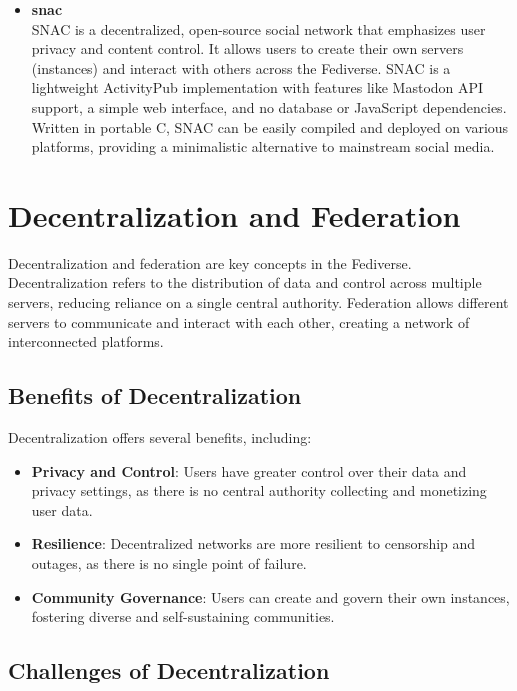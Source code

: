 \begin{itemize}
  \item \textbf{snac}\cite{snac}\\
    SNAC is a decentralized, open-source social network that emphasizes user privacy and content control. It allows users to create their own servers (instances) and interact with others across the Fediverse. SNAC is a lightweight ActivityPub implementation with features like Mastodon API support, a simple web interface, and no database or JavaScript dependencies. Written in portable C, SNAC can be easily compiled and deployed on various platforms, providing a minimalistic alternative to mainstream social media.

\end{itemize}

\section{Decentralization and Federation}

Decentralization and federation are key concepts in the Fediverse. Decentralization refers to the distribution of data and control across multiple servers, reducing reliance on a single central authority. Federation allows different servers to communicate and interact with each other, creating a network of interconnected platforms.

\subsection{Benefits of Decentralization}

Decentralization offers several benefits, including:

\begin{itemize}
  \item \textbf{Privacy and Control}: Users have greater control over their data and privacy settings, as there is no central authority collecting and monetizing user data.
  \item \textbf{Resilience}: Decentralized networks are more resilient to censorship and outages, as there is no single point of failure.
  \item \textbf{Community Governance}: Users can create and govern their own instances, fostering diverse and self-sustaining communities.
\end{itemize}

\subsection{Challenges of Decentralization}

